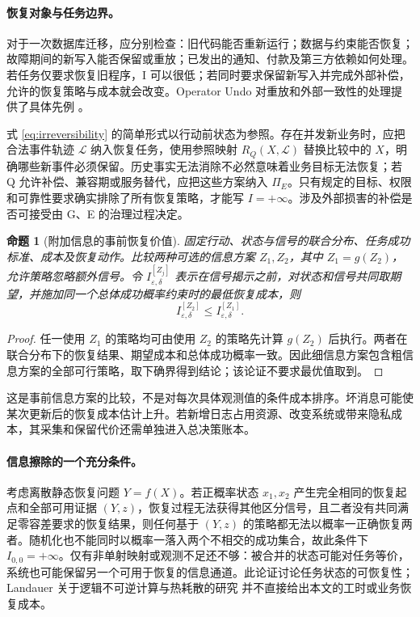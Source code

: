 \documentclass[11pt,a4paper]{ctexart}
\numberwithin{equation}{section}
\theoremstyle{definition}
\theoremstyle{plain}
\newtheorem{proposition}[definition]{命题}
\begin{document}
\paragraph{恢复对象与任务边界。}
对于一次数据库迁移，应分别检查：旧代码能否重新运行；数据与约束能否恢复；故障期间的新写入能否保留或重放；已发出的通知、付款及第三方依赖如何处理。若任务仅要求恢复旧程序，I 可以很低；若同时要求保留新写入并完成外部补偿，允许的恢复策略与成本就会改变。Operator Undo 对重放和外部一致性的处理提供了具体先例 \cite{brown2003}。

式 \eqref{eq:irreversibility} 的简单形式以行动前状态为参照。存在并发新业务时，应把合法事件轨迹 $\mathcal L$ 纳入恢复任务，使用参照映射 $R_Q(X,\mathcal L)$ 替换比较中的 $X$，明确哪些新事件必须保留。历史事实无法消除不必然意味着业务目标无法恢复；若 Q 允许补偿、兼容期或服务替代，应把这些方案纳入 $\Pi_E$。只有规定的目标、权限和可靠性要求确实排除了所有恢复策略，才能写 $I=+\infty$。涉及外部损害的补偿是否可接受由 G、E 的治理过程决定。

\begin{proposition}[附加信息的事前恢复价值]
固定行动、状态与信号的联合分布、任务成功标准、成本及恢复动作。比较两种可选的信息方案 $Z_1,Z_2$，其中 $Z_1=g(Z_2)$，允许策略忽略额外信号。令 $I_{\varepsilon,\delta}^{[Z_j]}$ 表示在信号揭示之前，对状态和信号共同取期望，并施加同一个总体成功概率约束时的最低恢复成本，则
\[
I_{\varepsilon,\delta}^{[Z_2]}
\le I_{\varepsilon,\delta}^{[Z_1]}.
\]
\end{proposition}
\begin{proof}
任一使用 $Z_1$ 的策略均可由使用 $Z_2$ 的策略先计算 $g(Z_2)$ 后执行。两者在联合分布下的恢复结果、期望成本和总体成功概率一致。因此细信息方案包含粗信息方案的全部可行策略，取下确界得到结论；该论证不要求最优值取到。
\end{proof}
这是事前信息方案的比较，不是对每次具体观测值的条件成本排序。坏消息可能使某次更新后的恢复成本估计上升。若新增日志占用资源、改变系统或带来隐私成本，其采集和保留代价还需单独进入总决策账本。

\paragraph{信息擦除的一个充分条件。}
考虑离散静态恢复问题 $Y=f(X)$。若正概率状态 $x_1,x_2$ 产生完全相同的恢复起点和全部可用证据 $(Y,z)$，恢复过程无法获得其他区分信号，且二者没有共同满足零容差要求的恢复结果，则任何基于 $(Y,z)$ 的策略都无法以概率一正确恢复两者。随机化也不能同时以概率一落入两个不相交的成功集合，故此条件下 $I_{0,0}=+\infty$。仅有非单射映射或观测不足还不够：被合并的状态可能对任务等价，系统也可能保留另一个可用于恢复的信息通道。此论证讨论任务状态的可恢复性；Landauer 关于逻辑不可逆计算与热耗散的研究 \cite{landauer1961} 并不直接给出本文的工时或业务恢复成本。
\end{document}
